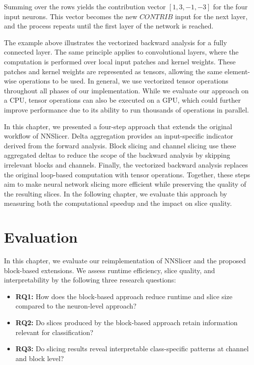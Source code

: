\documentclass[
12pt,
fancyheadings,
a4paper,
twoside,
BCOR=0.7cm,
nobcorignoretitle,
grayscalebody,
]{stsreprt}
\begin{document}
Summing over the rows yields the contribution vector $[1, 3, -1, -3]$ for the four input neurons.
This vector becomes the new $\textit{CONTRIB}$ input for the next layer, and the process repeats
until the first layer of the network is reached.

The example above illustrates the vectorized backward analysis for a fully connected layer.
The same principle applies to convolutional layers, where the computation is performed over local
input patches and kernel weights.
These patches and kernel weights are represented as tensors, allowing the same element-wise
operations to be used.
In general, we use vectorized tensor operations throughout all phases of our implementation.
While we evaluate our approach on a CPU, tensor operations can also be executed on a GPU, which
could further improve performance due to its ability to run thousands of operations in parallel.

\vspace{0.2cm}

In this chapter, we presented a four-step approach that extends the original workflow of NNSlicer. 
Delta aggregation provides an input-specific indicator derived from the forward analysis. 
Block slicing and channel slicing use these aggregated deltas to reduce the scope of the backward
analysis by skipping irrelevant blocks and channels. 
Finally, the vectorized backward analysis replaces the original loop-based computation with tensor
operations. 
Together, these steps aim to make neural network slicing more efficient while preserving the
quality of the resulting slices.
In the following chapter, we evaluate this approach by measuring both the computational speedup and
the impact on slice quality.



\chapter{Evaluation}
\label{chap:evaluation}

In this chapter, we evaluate our reimplementation of NNSlicer and the proposed block-based
extensions.
We assess runtime efficiency, slice quality, and interpretability by the following three research
questions:

\begin{itemize}
    \item \textbf{RQ1:} How does the block-based approach reduce runtime and slice size compared to the neuron-level approach?
    \item \textbf{RQ2:} Do slices produced by the block-based approach retain information relevant for classification?
    \item \textbf{RQ3:} Do slicing results reveal interpretable class-specific patterns at channel and block level?
\end{itemize}
\end{document}
